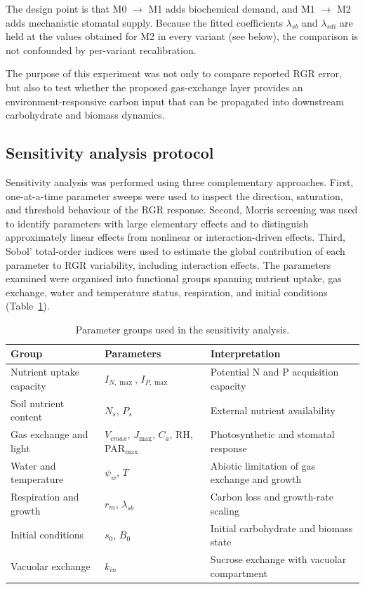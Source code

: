 \documentclass[a4paper,fleqn]{cas-sc}
\begin{document}
The design point is that M0 $\to$ M1 adds biochemical demand, and
M1 $\to$ M2 adds mechanistic stomatal supply. Because the fitted coefficients
$\lambda_{sb}$ and $\lambda_{sdi}$ are held at the values obtained for M2 in
every variant (see below), the comparison is not confounded by per-variant
recalibration.

The purpose of this experiment was not only to compare reported RGR error, but
also to test whether the proposed gas-exchange layer provides an
environment-responsive carbon input that can be propagated into downstream
carbohydrate and biomass dynamics.

\subsection{Sensitivity analysis protocol}
\label{sec:sensitivity_protocol}

Sensitivity analysis was performed using three complementary approaches. First,
one-at-a-time parameter sweeps were used to inspect the direction, saturation,
and threshold behaviour of the RGR response. Second, Morris screening was used
to identify parameters with large elementary effects and to distinguish
approximately linear effects from nonlinear or interaction-driven effects.
Third, Sobol' total-order indices were used to estimate the global contribution
of each parameter to RGR variability, including interaction effects. The
parameters examined were organised into functional groups spanning nutrient
uptake, gas exchange, water and temperature status, respiration, and initial
conditions (Table~\ref{tab:sensitivity_parameter_groups}).

\begin{table}[!htbp]
\centering
\caption{Parameter groups used in the sensitivity analysis.}
\label{tab:sensitivity_parameter_groups}
\begin{tabular}{lll}
\toprule
\textbf{Group} & \textbf{Parameters} & \textbf{Interpretation} \\
\midrule
Nutrient uptake capacity & $I_{N,\max}$, $I_{P,\max}$ & Potential N and P acquisition capacity \\
Soil nutrient content & $N_s$, $P_s$ & External nutrient availability \\
Gas exchange and light & $V_{cmax}$, $J_{\max}$, $C_a$, RH, PAR$_{\max}$ & Photosynthetic and stomatal response \\
Water and temperature & $\psi_w$, $T$ & Abiotic limitation of gas exchange and growth \\
Respiration and growth & $r_m$, $\lambda_{sb}$ & Carbon loss and growth-rate scaling \\
Initial conditions & $s_0$, $B_0$ & Initial carbohydrate and biomass state \\
Vacuolar exchange & $k_{in}$ & Sucrose exchange with vacuolar compartment \\
\bottomrule
\end{tabular}
\end{table}
\end{document}
